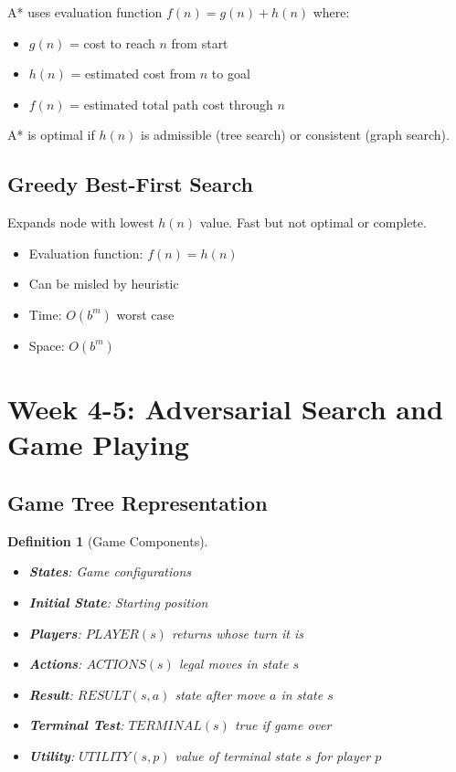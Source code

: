 \documentclass[11pt,letterpaper]{article}
\newtheorem{definition}{Definition}[section]
\begin{document}
\begin{important}
A* uses evaluation function $f(n) = g(n) + h(n)$ where:
\begin{itemize}
    \item $g(n)$ = cost to reach $n$ from start
    \item $h(n)$ = estimated cost from $n$ to goal
    \item $f(n)$ = estimated total path cost through $n$
\end{itemize}
A* is optimal if $h(n)$ is admissible (tree search) or consistent (graph search).
\end{important}

\subsection{Greedy Best-First Search}

\begin{concept}
Expands node with lowest $h(n)$ value. Fast but not optimal or complete.
\begin{itemize}
    \item Evaluation function: $f(n) = h(n)$
    \item Can be misled by heuristic
    \item Time: $O(b^m)$ worst case
    \item Space: $O(b^m)$
\end{itemize}
\end{concept}

\section{Week 4-5: Adversarial Search and Game Playing}

\subsection{Game Tree Representation}

\begin{definition}[Game Components]
\begin{itemize}
    \item \textbf{States}: Game configurations
    \item \textbf{Initial State}: Starting position
    \item \textbf{Players}: $PLAYER(s)$ returns whose turn it is
    \item \textbf{Actions}: $ACTIONS(s)$ legal moves in state $s$
    \item \textbf{Result}: $RESULT(s,a)$ state after move $a$ in state $s$
    \item \textbf{Terminal Test}: $TERMINAL(s)$ true if game over
    \item \textbf{Utility}: $UTILITY(s,p)$ value of terminal state $s$ for player $p$
\end{itemize}
\end{definition}
\end{document}
